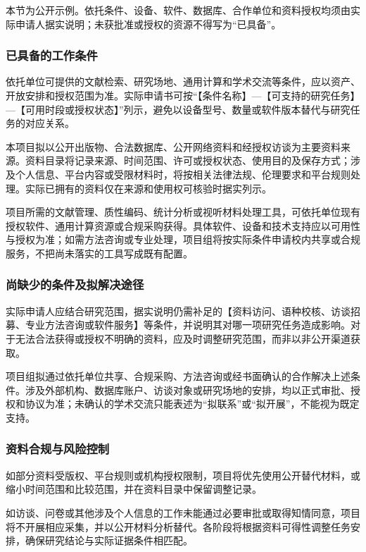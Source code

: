 \justifying
\NSFCBodyText

本节为公开示例。依托条件、设备、软件、数据库、合作单位和资料授权均须由实际申请人据实说明；未获批准或授权的资源不得写为“已具备”。

\subsubsection{已具备的工作条件}

依托单位可提供的文献检索、研究场地、通用计算和学术交流等条件，应以资产、开放安排和授权范围为准。实际申请书可按“【条件名称】---【可支持的研究任务】---【可用时段或授权状态】”列示，避免以设备型号、数量或软件版本替代与研究任务的对应关系。

本项目拟以公开出版物、合法数据库、公开网络资料和经授权访谈为主要资料来源。资料目录将记录来源、时间范围、许可或授权状态、使用目的及保存方式；涉及个人信息、平台内容或受限材料时，将按相关法律法规、伦理要求和平台规则处理。实际已拥有的资料仅在来源和使用权可核验时据实列示。

项目所需的文献管理、质性编码、统计分析或视听材料处理工具，可依托单位现有授权软件、通用计算资源或合规采购获得。具体软件、设备和技术支持应以可用性与授权为准；如需方法咨询或专业处理，项目组将按实际条件申请校内共享或合规服务，不把尚未落实的工具写成既有配置。

\subsubsection{尚缺少的条件及拟解决途径}

实际申请人应结合研究范围，据实说明仍需补足的【资料访问、语种校核、访谈招募、专业方法咨询或软件服务】等条件，并说明其对哪一项研究任务造成影响。对于无法合法获得或授权不明确的资料，应及时调整研究范围，而非以非公开渠道获取。

项目组拟通过依托单位共享、合规采购、方法咨询或经书面确认的合作解决上述条件。涉及外部机构、数据库账户、访谈对象或研究场地的安排，均以正式审批、授权和协议为准；未确认的学术交流只能表述为“拟联系”或“拟开展”，不能视为既定支持。

\subsubsection{资料合规与风险控制}

如部分资料受版权、平台规则或机构授权限制，项目将优先使用公开替代材料，或缩小时间范围和比较范围，并在资料目录中保留调整记录。

如访谈、问卷或其他涉及个人信息的工作未能通过必要审批或取得知情同意，项目将不开展相应采集，并以公开材料分析替代。各阶段将根据资料可得性调整任务安排，确保研究结论与实际证据条件相匹配。
